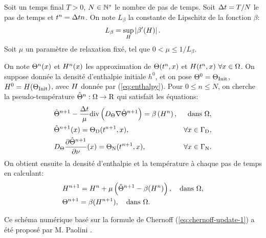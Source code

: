 Soit un temps final $T > 0$, $N\in \mathbb {\mathbb N^*}$ le nombre de pas de
temps. Soit $\Delta t = T / N$ le pas de temps et $t^n = \Delta t n$. On note
$L_\beta$ la constante de Lipschitz de la fonction $\beta$:
\begin{equation}
  L_\beta = \sup_{H}\left\lvert \beta'(H) \right\rvert.
\end{equation}
Soit $\mu$ un paramètre de relaxation fixé, tel que $0 < \mu \leq
1/L_\beta$.

On note $\Theta^n(x)$ et $H^n(x)$ les approximation
de $\Theta(t^n, x)$ et $H(t^n, x)\ \forall x\in
\Omega$.  On suppose donnée la densité d'enthalpie initiale $h^0$, et
on pose $\Theta^0 = \Theta_\text{Init}$, $H^0 = H(\Theta_\text{Init})$,
avec $H$ donnée par (\ref{eq:enthalpy}). Pour $0 \leq n \leq N$,
on cherche la pseudo-température
$\hat{\Theta}^n:\Omega\to\mathrm R$ qui satisfait les équations:
\begin{align}
  &\hat\temperature^{n+1} - \frac{\timestep}{\mu} \div\parent{
    \electrolytetdiff \nabla\hat\temperature^{n+1}} = %
  \beta\parent{\enthalpydensity^n}, & \text{dans } \Omega,\label{eq:chernoff-heat}\\
  &\hat\temperature^{n+1}(x) = \temperature_{\mathrm D}(t^{n+1}, x), &
  \forall x\in%
  \Gamma_\mathrm{D},\label{eq:chernoff-dirichlet}\\
  &\electrolytetdiff\frac{\partial\hat\temperature^{n+1}}{\partial \nu}(x) = %
  \temperature_\mathrm{N}(t^{n+1}, x), %
  & \forall x \in \Gamma_\mathrm{N}.\label{eq:chernoff-neumann}
\end{align}
On obtient ensuite la densité d'enthalpie et la température à chaque
pas de temps en calculant:
\begin{align}
  &H^{n+1} = H^{n} +
  \mu\left( \hat{\Theta}^{n+1} - \beta(H^{n}) \right), \quad
  \text{dans } \Omega,\label{eq:chernoff-update-1}\\
  &\Theta^{n+1} = \beta(H^{n+1}), \quad\text{dans }\Omega.\label{eq:chernoff-update-2}
\end{align}

Ce schéma numérique basé sur la formule de Chernoff
(\ref{eq:chernoff-update-1}) a été proposé par M. Paolini
\cite{Paolini1988}.

